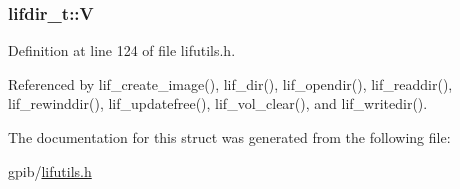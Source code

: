 \subsubsection[{\texorpdfstring{V}{V}}]{ lifdir\+\_\+t\+::V}\hypertarget{structlifdir__t_a6d9cb52ec6e3ff579ca3f45db9176ce9}{}\label{structlifdir__t_a6d9cb52ec6e3ff579ca3f45db9176ce9}


Definition at line 124 of file lifutils.\+h.



Referenced by lif\+\_\+create\+\_\+image(), lif\+\_\+dir(), lif\+\_\+opendir(), lif\+\_\+readdir(), lif\+\_\+rewinddir(), lif\+\_\+updatefree(), lif\+\_\+vol\+\_\+clear(), and lif\+\_\+writedir().



The documentation for this struct was generated from the following file\+:\begin{DoxyCompactItemize}
\item 
gpib/\hyperlink{lifutils_8h}{lifutils.\+h}\end{DoxyCompactItemize}
